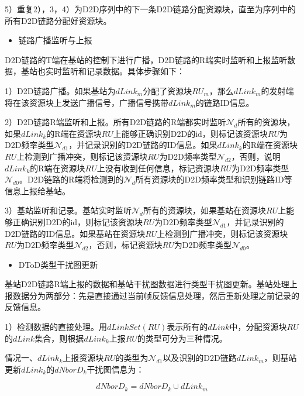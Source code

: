 \documentclass[figurelist,tablelist,algorithmlist,nomlist,masters]{seuthesix}
\begin{document}
	5）重复2），3，4）为D2D序列中的下一条D2D链路分配资源块，直至为序列中的所有D2D链路分配好资源块。
	
	
	\begin{itemize}
		\item 链路广播监听与上报
	\end{itemize}
	
	D2D链路的T端在基站的控制下进行广播，D2D链路的R端实时监听和上报监听数据，基站也实时监听和记录数据。具体步骤如下：
	
	1）D2D链路广播。如果基站为$dLink_m$分配了资源块$RU_m$，那么$dLink_m$的发射端将在该资源块上发送广播信号，广播信号携带$dLink_m$的链路ID信息。
	
	2）D2D链路R端监听和上报。所有D2D链路的R端都实时监听$\mathcal{N}_d$所有的资源块，如果$dLink_k$的R端在资源块$RU$上能够正确识别D2D的id，则标记该资源块$RU$为D2D频率类型$\mathcal{N}_{d1}$，并记录识别的D2D链路的ID信息。如果$dLink_k$的R端在资源块$RU$上检测到广播冲突，则标记该资源块$RU$为D2D频率类型$\mathcal{N}_{d2}$，否则，说明$dLink_k$的R端在资源块$RU$上没有收到任何信息，标记资源块$RU$为D2D频率类型$\mathcal{N}_{d0}$。D2D链路的R端将检测到的$\mathcal{N}_d$所有资源块的D2D频率类型和识别链路ID等信息上报给基站。
	
	3）基站监听和记录。基站实时监听$\mathcal{N}_d$所有的资源块，如果基站在资源块$RU$上能够正确识别D2D的id，则标记该资源块$RU$为D2D频率类型$\mathcal{N}_{d1}$，并记录识别的D2D链路的ID信息。如果基站在资源块$RU$上检测到广播冲突，则标记该资源块$RU$为D2D频率类型$\mathcal{N}_{d2}$，否则，标记资源块$RU$为D2D频率类型$\mathcal{N}_{d0}$。
	
	
	
	\begin{itemize}
		\item DToD类型干扰图更新
	\end{itemize}
	
	基站D2D链路R端上报的数据和基站干扰图数据进行类型干扰图更新。基站处理上报数据分为两部分：先是直接通过当前帧反馈信息处理，然后重新处理之前记录的反馈信息。
	
	1）检测数据的直接处理。用$dLinkSet(RU)$表示所有的$dLink$中，分配资源块$RU$的$dLink$集合，则根据$dLink_k$上报$RU$的类型可分为三种情况。
	
	情况一、$dLink_k$上报资源块$RU$的类型为$\mathcal{N}_{d1}$以及识别的D2D链路$dLink_m$，则基站更新$dLink_k$的$dNborD_k$干扰图信息为：
	
	\begin{equation}\label{eq2.12}
	dNborD_k = dNborD_k \cup dLink_m
	\end{equation}
	
\end{document}
